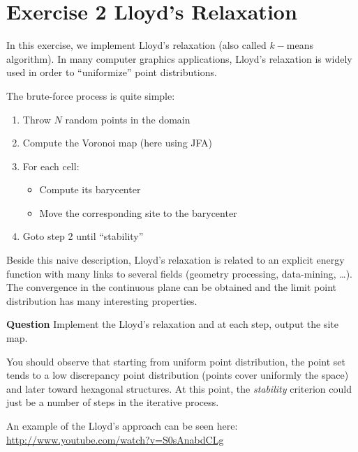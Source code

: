 \documentclass[a4paper, 11pt]{article}
\begin{document}
\section*{Exercise 2 \rm Lloyd's Relaxation}

\par In this exercise, we implement Lloyd's relaxation (also called $k-$means algorithm).  In many computer graphics applications, Lloyd's relaxation is widely used in order to ``uniformize'' point distributions. 

The brute-force process is quite simple: 
\begin{enumerate}
	\item Throw $N$ random points in the domain
	\item Compute the Voronoi map (here using JFA)
	\item For each cell:
	\begin{itemize}
		\item Compute its barycenter
		\item Move the corresponding site to the barycenter
	\end{itemize}
	\item Goto step 2 until ``stability''
\end{enumerate}

\par Beside this naive description, Lloyd's relaxation is related to an explicit energy function with many links to several fields (geometry processing, data-mining, \ldots). The convergence in the continuous plane can be obtained and the limit point distribution has many interesting properties.

\bigskip
{\bf Question} Implement the Lloyd's relaxation and at each step, output the site map.

\bigskip
\par You should observe that starting from uniform point distribution, the point set tends to a low discrepancy point distribution (points cover uniformly the space) and later toward hexagonal structures. At this point, the \emph{stability} criterion could just be a number of steps in the iterative process.

\par An example of the Lloyd's approach can be seen here: \url{http://www.youtube.com/watch?v=S0sAnabdCLg}
\end{document}
